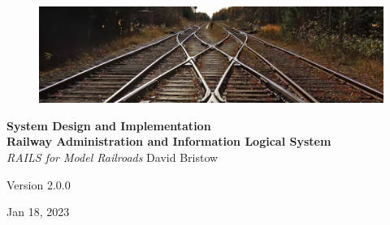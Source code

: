 \documentclass[letterpaper, oneside, 11pt]{book}
\begin{document}
\begin{titlepage}
	\raggedleft
	\begin{figure}[H]
	\centering
		\includegraphics[scale=1.53]{railway_track.jpg}
	\label{fig:track}
\end{figure}
	\vspace*{0.167\textheight}
	\textbf{\LARGE System Design and Implementation}\\[\baselineskip]
    \textbf{\textcolor{MyBlue}{\Huge R\Large ailway \Huge A\Large dministration and \Huge I\Large nformation \Huge L\Large ogical \Huge S\Large ystem}}\\[\baselineskip]
	{\Large \textit{RAILS for Model Railroads}}
	\vfill
    \vspace*{\baselineskip}
	{\small David Bristow}

	{\small Version 2.0.0}
	
	{\small Jan 18, 2023}
	\vspace*{3\baselineskip}
\end{titlepage}
\tableofcontents






\backmatter


\end{document}
